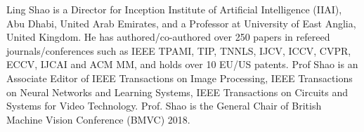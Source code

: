 \documentclass[10pt,journal,twocolumn]{IEEEtran}
\begin{document}
\begin{IEEEbiography}{Ling Shao}
is a Director for Inception Institute of Artificial Intelligence (IIAI), Abu Dhabi, United Arab Emirates, and a Professor at University of East Anglia, United Kingdom. He has authored/co-authored over 250 papers in refereed journals/conferences such as IEEE TPAMI, TIP, TNNLS, IJCV, ICCV, CVPR, ECCV, IJCAI and ACM MM, and holds over 10 EU/US patents. Prof Shao is an Associate Editor of IEEE Transactions on Image Processing, IEEE Transactions on Neural Networks and Learning Systems, IEEE Transactions on Circuits and Systems for Video Technology.  Prof. Shao is the General Chair of British Machine Vision Conference (BMVC) 2018.
\end{IEEEbiography}



\ifCLASSOPTIONcaptionsoff
  \newpage
\fi
\end{document}
